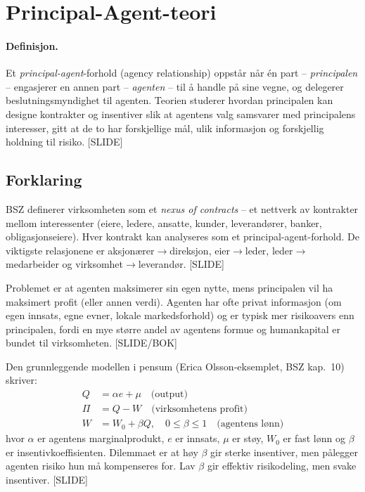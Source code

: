 \section{Principal-Agent-teori}\label{thr:principal-agent}

\paragraph{Definisjon.} Et \emph{principal-agent}-forhold (agency relationship) oppstår når én part -- \emph{principalen} -- engasjerer en annen part -- \emph{agenten} -- til å handle på sine vegne, og delegerer beslutningsmyndighet til agenten. Teorien studerer hvordan principalen kan designe kontrakter og insentiver slik at agentens valg samsvarer med principalens interesser, gitt at de to har forskjellige mål, ulik informasjon og forskjellig holdning til risiko. [SLIDE]

\subsection*{Forklaring}

BSZ definerer virksomheten som et \emph{nexus of contracts} -- et nettverk av kontrakter mellom interessenter (eiere, ledere, ansatte, kunder, leverandører, banker, obligasjonseiere). Hver kontrakt kan analyseres som et principal-agent-forhold. De viktigste relasjonene er aksjonærer$\to$direksjon, eier$\to$leder, leder$\to$medarbeider og virksomhet$\to$leverandør. [SLIDE]

Problemet er at agenten maksimerer sin egen nytte, mens principalen vil ha maksimert profit (eller annen verdi). Agenten har ofte privat informasjon (om egen innsats, egne evner, lokale markedsforhold) og er typisk mer risikoavers enn principalen, fordi en mye større andel av agentens formue og humankapital er bundet til virksomheten. [SLIDE/BOK]

Den grunnleggende modellen i pensum (Erica Olsson-eksemplet, BSZ kap.~10) skriver:
\begin{align*}
Q &= \alpha e + \mu \quad \text{(output)}\\
\Pi &= Q - W \quad \text{(virksomhetens profit)}\\
W &= W_0 + \beta Q, \quad 0 \le \beta \le 1 \quad \text{(agentens lønn)}
\end{align*}
hvor $\alpha$ er agentens marginalprodukt, $e$ er innsats, $\mu$ er støy, $W_0$ er fast lønn og $\beta$ er insentivkoeffisienten. Dilemmaet er at høy $\beta$ gir sterke insentiver, men pålegger agenten risiko hun må kompenseres for. Lav $\beta$ gir effektiv risikodeling, men svake insentiver. [SLIDE]

